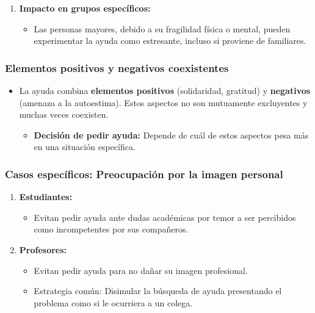 \documentclass[
]{book}
\providecommand{\tightlist}{%
  \setlength{\itemsep}{0pt}\setlength{\parskip}{0pt}}
\begin{document}
\begin{enumerate}
\def\labelenumi{\arabic{enumi}.}
\setcounter{enumi}{1}
\tightlist
\item
  \textbf{Impacto en grupos específicos:}

  \begin{itemize}
  \tightlist
  \item
    Las personas mayores, debido a su fragilidad física o mental, pueden experimentar la ayuda como estresante, incluso si proviene de familiares.
  \end{itemize}
\end{enumerate}

\subsubsection{Elementos positivos y negativos coexistentes}\label{elementos-positivos-y-negativos-coexistentes}

\begin{itemize}
\tightlist
\item
  La ayuda combina \textbf{elementos positivos} (solidaridad, gratitud) y \textbf{negativos} (amenaza a la autoestima). Estos aspectos no son mutuamente excluyentes y muchas veces coexisten.

  \begin{itemize}
  \tightlist
  \item
    \textbf{Decisión de pedir ayuda:} Depende de cuál de estos aspectos pesa más en una situación específica.
  \end{itemize}
\end{itemize}

\subsubsection{Casos específicos: Preocupación por la imagen personal}\label{casos-especuxedficos-preocupaciuxf3n-por-la-imagen-personal}

\begin{enumerate}
\def\labelenumi{\arabic{enumi}.}
\tightlist
\item
  \textbf{Estudiantes:}

  \begin{itemize}
  \tightlist
  \item
    Evitan pedir ayuda ante dudas académicas por temor a ser percibidos como incompetentes por sus compañeros.
  \end{itemize}
\item
  \textbf{Profesores:}

  \begin{itemize}
  \tightlist
  \item
    Evitan pedir ayuda para no dañar su imagen profesional.
  \item
    Estrategia común: Disimular la búsqueda de ayuda presentando el problema como si le ocurriera a un colega.
  \end{itemize}
\end{enumerate}
\end{document}
